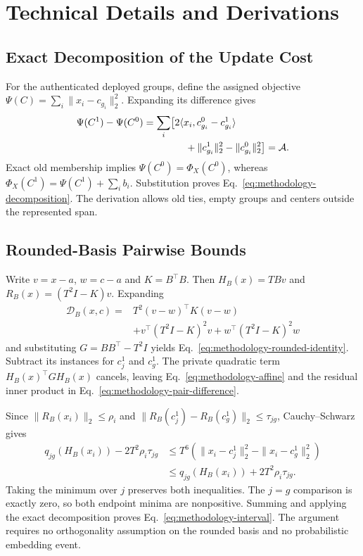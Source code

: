 \section{Technical Details and Derivations}
\label{app:methodology-proofs}
\subsection{Exact Decomposition of the Update Cost}
For the authenticated deployed groups, define the assigned objective
$\Psi(C)=\sum_i\|x_i-c_{g_i}\|_2^2$. Expanding its difference gives
\begin{align}
 \Psi(C^1)-\Psi(C^0)
 &=\sum_i\bigl[2\langle x_i,c^0_{g_i}-c^1_{g_i}\rangle\nonumber\\
 &\hspace{15mm}+\|c^1_{g_i}\|_2^2-\|c^0_{g_i}\|_2^2\bigr]
 =\mathcal A.
\end{align}
Exact old membership implies $\Psi(C^0)=\Phi_X(C^0)$, whereas
$\Phi_X(C^1)=\Psi(C^1)+\sum_i b_i$. Substitution proves
Eq.~\eqref{eq:methodology-decomposition}. The derivation allows old ties,
empty groups and centers outside the represented span.

\subsection{Rounded-Basis Pairwise Bounds}
Write $v=x-a$, $w=c-a$ and $K=B^\top B$. Then
$H_B(x)=TBv$ and $R_B(x)=(T^2I-K)v$. Expanding
\begin{align}
 \mathcal D_B(x,c)
 ={}&T^2(v-w)^\top K(v-w)\nonumber\\
 &+v^\top(T^2I-K)^2v+w^\top(T^2I-K)^2w
\end{align}
and substituting $G=BB^\top-T^2I$ yields
Eq.~\eqref{eq:methodology-rounded-identity}. Subtract its instances for
$c^1_j$ and $c^1_g$. The private quadratic term $H_B(x)^\top GH_B(x)$
cancels, leaving Eq.~\eqref{eq:methodology-affine} and the residual inner
product in Eq.~\eqref{eq:methodology-pair-difference}.

Since $\|R_B(x_i)\|_2\leq\rho_i$ and
$\|R_B(c^1_j)-R_B(c^1_g)\|_2\leq\tau_{jg}$, Cauchy--Schwarz gives
\begin{align}
 q_{jg}(H_B(x_i))-2T^2\rho_i\tau_{jg}
 &\leq T^6(\|x_i-c^1_j\|_2^2-\|x_i-c^1_g\|_2^2)\nonumber\\
 &\leq q_{jg}(H_B(x_i))+2T^2\rho_i\tau_{jg}.
\end{align}
Taking the minimum over $j$ preserves both inequalities. The $j=g$
comparison is exactly zero, so both endpoint minima are nonpositive.
Summing and applying the exact decomposition proves
Eq.~\eqref{eq:methodology-interval}. The argument requires no orthogonality
assumption on the rounded basis and no probabilistic embedding event.

